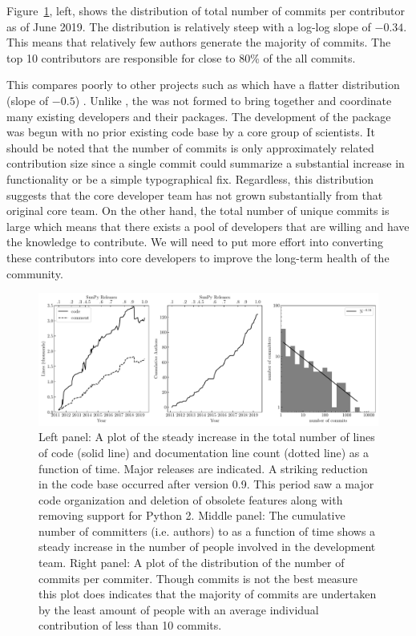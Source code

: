 Figure~\ref{fig:metafig}, left, shows the distribution of total number of commits per contributor as of June 2019.
The distribution is relatively steep with a log-log slope of $-0.34$.
This means that relatively few authors generate the majority of commits.
The top 10 contributors are responsible for close to 80\% of the all commits. 

This compares poorly to other projects such as \astropy which have a flatter distribution (slope of $-0.5$) \citep{astropy2018}.
Unlike \astropy, the \sunpyproj was not formed to bring together and coordinate many existing developers and their \python packages.
The development of the \sunpypkg package was begun with no prior existing code base by a core group of scientists.
It should be noted that the number of commits is only approximately related contribution size since a single commit could summarize a substantial increase in functionality or be a simple typographical fix.
Regardless, this distribution suggests that the core developer team has not grown substantially from that original core team.
On the other hand, the total number of unique commits is large which means that there exists a pool of \sunpypkg developers that are willing and have the knowledge to contribute.
We will need to put more effort into converting these contributors into core developers to improve the long-term health of the community.


\begin{figure}
    \center
    \includegraphics[width = 1.0\textwidth]{figures/dev_meta.pdf}
    \caption{Left panel: A plot of the steady increase in the total number of lines of code (solid line) and documentation line count (dotted line) as a function of time.
	Major releases are indicated.
	A striking reduction in the code base occurred after version 0.9.
	This period saw a major code organization and deletion of obsolete features along with removing support for Python 2.
	Middle panel: The cumulative number of committers (i.e. authors) to \sunpypkg as a function of time shows a steady increase in the number of people involved in the development team.
	Right panel: A plot of the distribution of the number of commits per commiter.
	Though commits is not the best measure this plot does indicates that the majority of commits are undertaken by the least amount of people with an average individual contribution of less than 10 commits.}
\label{fig:metafig}
\end{figure}
